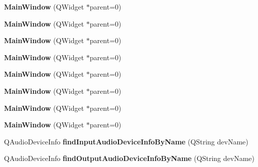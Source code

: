 \begin{DoxyCompactItemize}
\item 
\mbox{\label{class_main_window_a8b244be8b7b7db1b08de2a2acb9409db}} 
{\bfseries Main\+Window} (Q\+Widget $\ast$parent=0)
\item 
\mbox{\label{class_main_window_a8b244be8b7b7db1b08de2a2acb9409db}} 
{\bfseries Main\+Window} (Q\+Widget $\ast$parent=0)
\item 
\mbox{\label{class_main_window_a8b244be8b7b7db1b08de2a2acb9409db}} 
{\bfseries Main\+Window} (Q\+Widget $\ast$parent=0)
\item 
\mbox{\label{class_main_window_a8b244be8b7b7db1b08de2a2acb9409db}} 
{\bfseries Main\+Window} (Q\+Widget $\ast$parent=0)
\item 
\mbox{\label{class_main_window_a8b244be8b7b7db1b08de2a2acb9409db}} 
{\bfseries Main\+Window} (Q\+Widget $\ast$parent=0)
\item 
\mbox{\label{class_main_window_a8b244be8b7b7db1b08de2a2acb9409db}} 
{\bfseries Main\+Window} (Q\+Widget $\ast$parent=0)
\item 
\mbox{\label{class_main_window_a8b244be8b7b7db1b08de2a2acb9409db}} 
{\bfseries Main\+Window} (Q\+Widget $\ast$parent=0)
\item 
\mbox{\label{class_main_window_a8b244be8b7b7db1b08de2a2acb9409db}} 
{\bfseries Main\+Window} (Q\+Widget $\ast$parent=0)
\item 
\mbox{\label{class_main_window_a0888b6aa425ad1b82df280d1176c6c52}} 
Q\+Audio\+Device\+Info {\bfseries find\+Input\+Audio\+Device\+Info\+By\+Name} (Q\+String dev\+Name)
\item 
\mbox{\label{class_main_window_ad3d360185c7769d271d54353c6e145a4}} 
Q\+Audio\+Device\+Info {\bfseries find\+Output\+Audio\+Device\+Info\+By\+Name} (Q\+String dev\+Name)
\end{DoxyCompactItemize}
